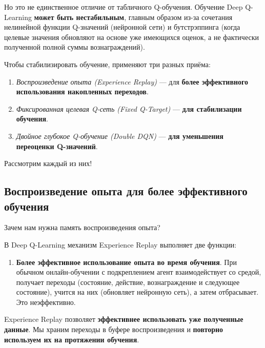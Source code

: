 \documentclass[11pt,a4paper]{article}
\begin{document}

Но это не единственное отличие от табличного Q-обучения. Обучение Deep Q-Learning \textbf{может быть нестабильным}, главным образом из-за сочетания нелинейной функции Q-значений (нейронной сети) и бутстрэппинга (когда целевые значения обновляют на основе уже имеющихся оценок, а не фактически полученной полной суммы вознаграждений).

Чтобы стабилизировать обучение, применяют три разных приёма:

\begin{enumerate}
\def\labelenumi{\arabic{enumi}.}
\tightlist
\item
\emph{Воспроизведение опыта (Experience Replay)} --- для \textbf{более эффективного использования накопленных переходов}.
\item
\emph{Фиксированная целевая Q-сеть (Fixed Q-Target)} --- \textbf{для стабилизации обучения}.
\item
\emph{Двойное глубокое Q-обучение (Double DQN)} --- \textbf{для уменьшения переоценки Q-значений}.
\end{enumerate}

Рассмотрим каждый из них!

\subsection{Воспроизведение опыта для более эффективного обучения}\label{experience-replay-to-make-more-efficient-use-of-experiences}

Зачем нам нужна память воспроизведения опыта?

В Deep Q-Learning механизм Experience Replay выполняет две функции:

\begin{enumerate}
\def\labelenumi{\arabic{enumi}.}
\tightlist
\item
\textbf{Более эффективное использование опыта во время обучения}. При обычном онлайн-обучении с подкреплением агент взаимодействует со средой, получает переходы (состояние, действие, вознаграждение и следующее состояние), учится на них (обновляет нейронную сеть), а затем отбрасывает. Это неэффективно.
\end{enumerate}

Experience Replay позволяет \textbf{эффективнее использовать уже полученные данные}. Мы храним переходы в буфере воспроизведения и \textbf{повторно используем их на протяжении обучения}.
\end{document}
